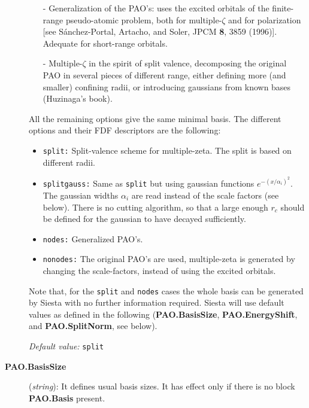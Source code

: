 \documentclass[11pt]{article}
\begin{document}
\begin{description}
\begin{itemize}
\item[-] Generalization of the PAO's: uses the excited orbitals of the
finite-range pseudo-atomic problem, both for multiple-$\zeta$ and for
polarization [see S\'anchez-Portal, Artacho, and Soler, JPCM {\bf 8},
3859 (1996)]. Adequate for short-range orbitals.

\item[-] Multiple-$\zeta$ in the spirit of split valence, decomposing the original PAO in several pieces of different
range, either defining more (and smaller) confining radii, or
introducing gaussians from known bases (Huzinaga's
book).
\end{itemize}

\noindent
All the remaining options
give the same minimal basis. 
The different options and their FDF descriptors are the following:

\begin{itemize}

\item {\tt split:} Split-valence scheme for multiple-zeta.
The split is based on different radii. 

\item {\tt splitgauss:}
Same as {\tt split} but using gaussian functions
$e^{-(x/\alpha_i)^2}$. The gaussian widths $\alpha_i$ are read instead 
of the scale factors (see below). There is no cutting algorithm, so that
a large enough $r_c$ should be defined for the gaussian to have decayed
sufficiently.

\item {\tt nodes:} Generalized PAO's.

\item {\tt nonodes:} 
The original PAO's are used, multiple-zeta is generated
by changing the scale-factors, instead of using the excited orbitals. 

\end{itemize}

\noindent
Note that, for the {\tt split} and {\tt nodes} cases
the whole basis can be generated by {\sc Siesta} with no further information
required. {\sc Siesta} will use default values as defined in the following 
({\bf PAO.BasisSize},
{\bf PAO.EnergyShift}, and {\bf PAO.SplitNorm}, see below).

{\it Default value:} {\tt split}


\item[{\bf PAO.BasisSize}] ({\it string}): 
It defines usual basis sizes. It has effect only if there is no 
block {\bf PAO.Basis} present.


\end{description}
\end{document}
